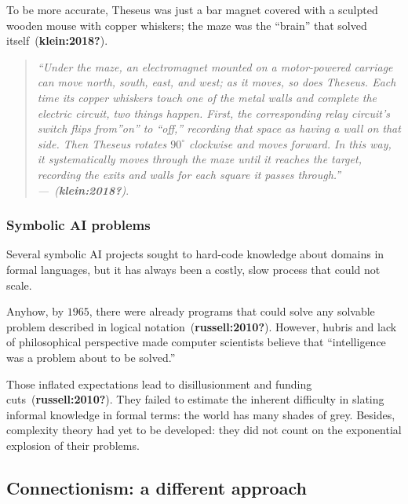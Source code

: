 \documentclass[
  letterpaper,
  DIV=11,
  numbers=noendperiod,
  oneside]{scrreprt}
\begin{document}
To be more accurate, Theseus was just a bar magnet covered with a
sculpted wooden mouse with copper whiskers; the maze was the ``brain''
that solved itself~(\textbf{klein:2018?}).

\begin{quote}
\emph{``Under the maze, an electromagnet mounted on a motor-­powered
carriage can move north, south, east, and west; as it moves, so does
Theseus. Each time its copper whiskers touch one of the metal walls and
complete the electric circuit, two things happen. First, the
corresponding relay circuit's switch flips from''on'' to ``off,''
recording that space as having a wall on that side. Then Theseus rotates
\(90^{\circ}\) clockwise and moves forward. In this way, it
systematically moves through the maze until it reaches the target,
recording the exits and walls for each square it passes through.''
---~(\textbf{klein:2018?})}.
\end{quote}

\hypertarget{symbolic-ai-problems}{%
\subsubsection{Symbolic AI problems}\label{symbolic-ai-problems}}

Several symbolic AI projects sought to hard-code knowledge about domains
in formal languages, but it has always been a costly, slow process that
could not scale.

Anyhow, by \(1965\), there were already programs that could solve any
solvable problem described in logical notation~(\textbf{russell:2010?}).
However, hubris and lack of philosophical perspective made computer
scientists believe that ``intelligence was a problem about to be
solved.''

Those inflated expectations lead to disillusionment and funding
cuts~(\textbf{russell:2010?}).
They failed to estimate the inherent difficulty in slating informal
knowledge in formal terms: the world has many shades of grey. Besides,
complexity theory had yet to be developed: they did not count on the
exponential explosion of their problems.

\hypertarget{connectionism-a-different-approach}{%
\subsection{Connectionism: a different
approach}\label{connectionism-a-different-approach}}
\end{document}
